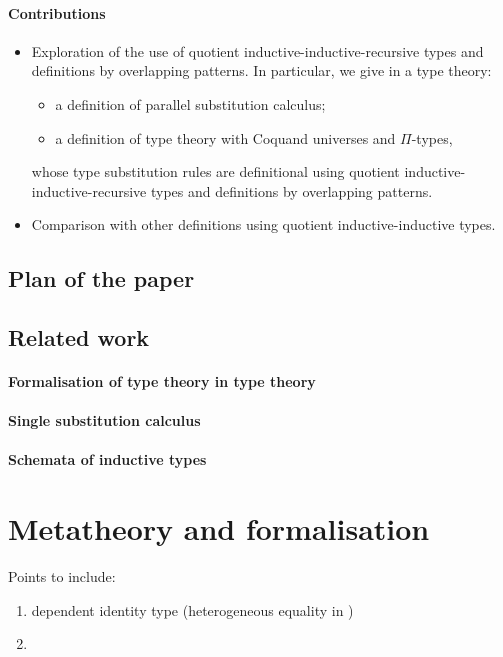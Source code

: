 \documentclass[a4paper,UKenglish,numberwithinsect,cleveref,thm-restate]{lipics-v2021}
\begin{document}
\paragraph*{Contributions}
\begin{itemize}
  \item Exploration of the use of quotient inductive-inductive-recursive types and definitions by overlapping patterns.
    In particular, we give in a type theory:
    \begin{itemize}
      \item a definition of parallel substitution calculus;
      \item a definition of type theory with Coquand universes and $\Pi$-types,
    \end{itemize}
   whose type substitution rules are definitional using quotient inductive-inductive-recursive types and definitions by overlapping patterns.
  \item Comparison with other definitions using quotient inductive-inductive types.
\end{itemize}


\subsection{Plan of the paper}
\subsection{Related work}
\paragraph*{Formalisation of type theory in type theory}
\cite{Danielsson2006,Altenkirch2016a}
\cite{Altenkirch2017}

\paragraph*{Single substitution calculus}
\cite{Kaposi2023,Kaposi2024a}
\paragraph*{Schemata of inductive types}
\cite{Kaposi2019}
\cite{Dybjer2003,Dybjer2000,Dybjer1999}

\section{Metatheory and formalisation}
\cite{Pujet2022,Pujet2024,Pujet2022a}
Points to include:
\begin{enumerate}
  \item dependent identity type (heterogeneous equality in \Agda)
  \item 
\end{enumerate}
\end{document}
